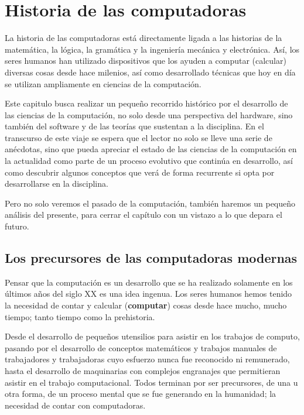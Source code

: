 
\chapter{Historia de las computadoras}
\label{chap:historia_computadoras}

La historia de las computadoras está directamente ligada a las historias de la
matemática, la lógica, la gramática y la ingeniería mecánica y electrónica. Así,
los seres humanos han utilizado dispositivos que los ayuden a computar
(calcular) diversas cosas desde hace milenios, así como desarrollado técnicas
que hoy en día se utilizan ampliamente en ciencias de la computación.

Este capitulo busca realizar un pequeño recorrido histórico por el desarrollo de
las ciencias de la computación, no solo desde una perspectiva del hardware, sino
también del software y de las teorías que sustentan a la disciplina. En el
transcurso de este viaje se espera que el lector no solo se lleve una serie de
anécdotas, sino que pueda apreciar el estado de las ciencias de la computación
en la actualidad como parte de un proceso evolutivo que continúa en desarrollo,
así como descubrir algunos conceptos que verá de forma recurrente si opta por
desarrollarse en la disciplina.

Pero no solo veremos el pasado de la computación, también haremos un pequeño
análisis del presente, para cerrar el capítulo con un vistazo a lo que depara el
futuro.

\section{Los precursores de las computadoras modernas}
\label{chap:historia_computadoras:sec:precursores}

Pensar que la computación es un desarrollo que se ha realizado solamente en los
últimos años del siglo XX es una idea ingenua. Los seres humanos hemos tenido la
necesidad de contar y calcular (\textbf{computar}) cosas desde hace mucho, mucho
tiempo; tanto tiempo como la prehistoria.

Desde el desarrollo de pequeños utensilios para asistir en los trabajos de
computo, pasando por el desarrollo de conceptos matemáticos y trabajos manuales
de trabajadores y trabajadoras cuyo esfuerzo nunca fue reconocido ni remunerado,
hasta el desarrollo de maquinarias con complejos engranajes que permitieran
asistir en el trabajo computacional. Todos terminan por ser precursores, de una
u otra forma, de un proceso mental que se fue generando en la humanidad; la
necesidad de contar con computadoras.

